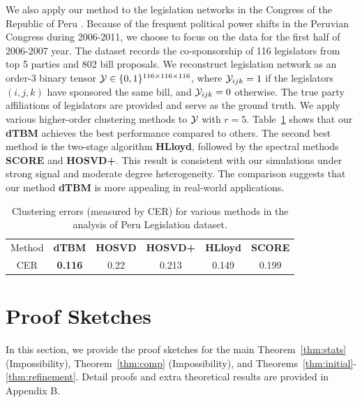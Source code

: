 \documentclass[journal]{IEEEtran}
\theoremstyle{definition}
\theoremstyle{definition}
\begin{document}
We also apply our method to the legislation networks in the Congress of the Republic of Peru \citep{lee2017time}. Because of the frequent political power shifts in the Peruvian Congress during 2006-2011, we choose to focus on the data for the first half of 2006-2007 year. The dataset records the co-sponsorship of 116 legislators from top 5 parties and 802 bill proposals. We reconstruct legislation network as an order-3 binary tensor $\mathcal{Y} \in \{0,1\}^{116 \times 116 \times 116}$, where $\mathcal{Y}_{ijk} = 1$ if the legislators $(i,j,k)$ have sponsored the same bill, and $\mathcal{Y}_{ijk} = 0$ otherwise. The true party affiliations of legislators are provided and serve as the ground truth. We apply various higher-order clustering methods to $\mathcal{Y}$ with $r = 5$. Table~\ref{tab:peru} shows that our \textbf{\small dTBM} achieves the best performance compared to others. The second best method is the two-stage algorithm \textbf{\small HLloyd}, followed by the spectral methods \textbf{\small SCORE} and \textbf{\small HOSVD+}. This result is consistent with our simulations under strong signal and moderate degree heterogeneity. The comparison suggests that our method \textbf{\small dTBM} is more appealing in real-world applications.

\begin{table}[ht]
\renewcommand{\arraystretch}{1.3}
    \centering
    \begin{tabular}{c |c  c cc c} 
    \hline 
        Method & \textbf{\small dTBM} 
        &\textbf{\small HOSVD}
        &\textbf{\small HOSVD+} & \textbf{\small HLloyd} &  \textbf{\small SCORE}\\
         CER & \textbf{0.116}
         &  0.22 
         &0.213 & 0.149 &0.199\\
         \hline
    \end{tabular}
    \caption{Clustering errors (measured by CER) for various methods in the analysis of Peru Legislation dataset.}
    \label{tab:peru}
\end{table}

\section{Proof Sketches}\label{sec:mainproof}


In this section, we provide the proof sketches for the main Theorem~\ref{thm:stats} (Impossibility), Theorem~\ref{thm:comp} (Impossibility), and Theorems~\ref{thm:initial}-\ref{thm:refinement}. Detail proofs and extra theoretical results are provided in Appendix B.
\end{document}
